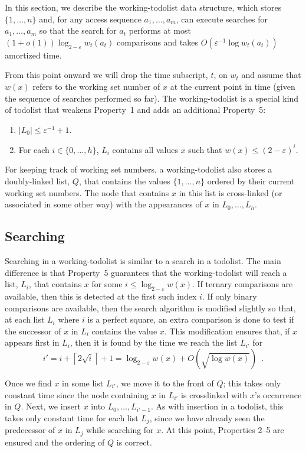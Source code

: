 \documentclass[lotsofwhite]{patmorin}
\newcommand{\eps}{\varepsilon}
\begin{document}
In this section, we describe the working-todolist data structure, which
stores $\{1,\ldots,n\}$ and, for any access sequence $a_1,\ldots,a_m$,
can execute searches for $a_1,\ldots,a_m$ so that the search for $a_t$
performs at most $(1+o(1))\log_{2-\eps} w_t(a_t)$ comparisons and takes
$O(\eps^{-1}\log w_t(a_t))$ amortized time.

From this point onward we will drop the time subscript, $t$, on $w_t$
and assume that $w(x)$ refers to the working set number of $x$ at the
current point in time (given the sequence of searches performed so far).
The working-todolist is a special kind of todolist that weakens Property~1
and adds an additional Property~5:

\begin{enumerate}
\item $|L_0|\le \eps^{-1}+1$.
\setcounter{enumi}{4}
\item For each $i\in\{0,\ldots,h\}$, $L_i$ contains all values $x$ such that $w(x)\le (2-\eps)^i$.
\end{enumerate}

For keeping track of working set numbers, a working-todolist also stores a
doubly-linked list, $Q$, that contains the values $\{1,\ldots,n\}$
ordered by their current working set numbers.  The node that contains $x$
in this list is cross-linked (or associated in some other way) with the
appearances of $x$ in $L_0,\ldots,L_h$.

\subsection{Searching}

Searching in a working-todolist is similar to a search in a todolist.
The main
difference is that Property~5 guarantees that the working-todolist will reach
a list, $L_i$, that contains $x$ for some $i\le\log_{2-\eps} w(x)$.
If ternary comparisons are available, then this is detected at the
first such index $i$.  If only binary comparisons are available, then
the search algorithm is modified slightly so that, at each list $L_i$
where $i$ is a perfect square, an extra comparison is done to test if
the successor of $x$ in $L_i$ contains the value $x$.  This modification
ensures that, if $x$ appears first in $L_i$, then it is found by the
time we reach the list $L_{i'}$ for
\[
     i'=i+\left\lceil 2\sqrt{i}\right\rceil + 1 = \log_{2-\eps} w(x) + O(\sqrt{\log w(x)}) \enspace .
\]

Once we find $x$ in some list $L_{i'}$, we move it to the front of $Q$;
this takes only constant time since the node containing $x$ in $L_{i'}$
is crosslinked with $x$'s occurrence in $Q$.  Next, we insert $x$ into
$L_0,\ldots,L_{i'-1}$.  As with insertion in a todolist, this takes only
constant time for each list $L_j$, since we have already seen the predecessor
of $x$ in $L_j$ while searching for $x$.  
At this point, Properties 2--5 are ensured and the ordering of $Q$ is
correct.  
\end{document}
